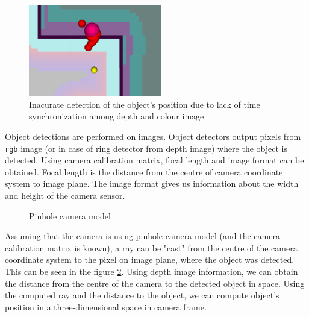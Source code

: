 \documentclass[12pt,a4paper]{article}
\begin{document}

	\begin{figure}[h]
		\centering
		\includegraphics[height=4cm]{images/detections}
		\caption{Inacurate detection of the object's position due to lack of time synchronization among depth and colour image}
		\label{fig:non_synchronized_raw_detection}
	\end{figure}
	
	Object detections are performed on images. Object detectors output pixels from \texttt{rgb} image (or in case of ring detector from depth image) where the object is detected. Using camera calibration matrix, focal length and image format can be obtained. Focal length is the distance from the centre of camera coordinate system to image plane. The image format gives us information about the width and height of the camera sensor. \\

	\begin{figure}[h]
		\centering
		\caption{Pinhole camera model}
		\label{fig:pinhole_camera_model}
	\end{figure}
	
	
	Assuming that the camera is using pinhole camera model (and the camera calibration matrix is known), a ray can be "cast" from the centre of the camera coordinate system to the pixel on image plane, where the object was detected. This can be seen in the figure \ref{fig:pinhole_camera_model}. Using depth image information, we can obtain the distance from the centre of the camera to the detected object in space. Using the computed ray and the distance to the object, we can compute object's position in a three-dimensional space in camera frame. \\
	
\end{document}
